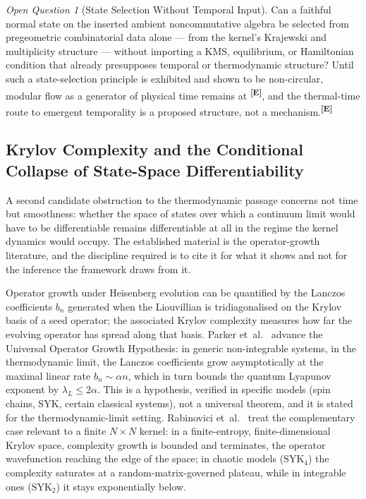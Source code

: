 \documentclass[12pt,a4paper,twoside]{article}
\theoremstyle{plain}
\theoremstyle{definition}
\theoremstyle{remark}
\newtheorem{openquestion}{Open Question}
\newcommand{\catmark}[1]{\textsuperscript{\textsf{\textbf{[#1]}}}}
\begin{document}
\begin{openquestion}[State Selection Without Temporal Input]
\label{oq:state-selection}
Can a faithful normal state on the inserted ambient noncommutative algebra
be selected from pregeometric combinatorial data alone --- from the
kernel's Krajewski and multiplicity structure --- without importing a KMS,
equilibrium, or Hamiltonian condition that already presupposes temporal or
thermodynamic structure? Until such a state-selection principle is
exhibited and shown to be non-circular, modular flow as a generator of
physical time remains at \catmark{E}, and the thermal-time route to
emergent temporality is a proposed structure, not a
mechanism.\catmark{E}
\end{openquestion}

\subsection{Krylov Complexity and the Conditional Collapse of State-Space Differentiability}
\label{subsec:krylov-collapse}

A second candidate obstruction to the thermodynamic passage concerns not
time but smoothness: whether the space of states over which a continuum
limit would have to be differentiable remains differentiable at all in the
regime the kernel dynamics would occupy. The established material is the
operator-growth literature, and the discipline required is to cite it for
what it shows and not for the inference the framework draws from it.

Operator growth under Heisenberg evolution can be quantified by the Lanczos
coefficients $b_n$ generated when the Liouvillian is tridiagonalised on the
Krylov basis of a seed operator; the associated Krylov complexity measures
how far the evolving operator has spread along that basis. Parker
et~al.~\cite{parker2019} advance the Universal Operator Growth Hypothesis:
in generic non-integrable systems, in the thermodynamic limit, the Lanczos
coefficients grow asymptotically at the maximal linear rate
$b_n \sim \alpha n$, which in turn bounds the quantum Lyapunov exponent by
$\lambda_L \le 2\alpha$. This is a hypothesis, verified in specific models
(spin chains, SYK, certain classical systems), not a universal theorem, and
it is stated for the thermodynamic-limit setting. Rabinovici
et~al.~\cite{rabinovici2021} treat the complementary case relevant to a
finite $N\times N$ kernel: in a finite-entropy, finite-dimensional Krylov
space, complexity growth is bounded and terminates, the operator
wavefunction reaching the edge of the space; in chaotic models
($\mathrm{SYK}_4$) the complexity saturates at a random-matrix-governed
plateau, while in integrable ones ($\mathrm{SYK}_2$) it stays exponentially
below.
\end{document}
